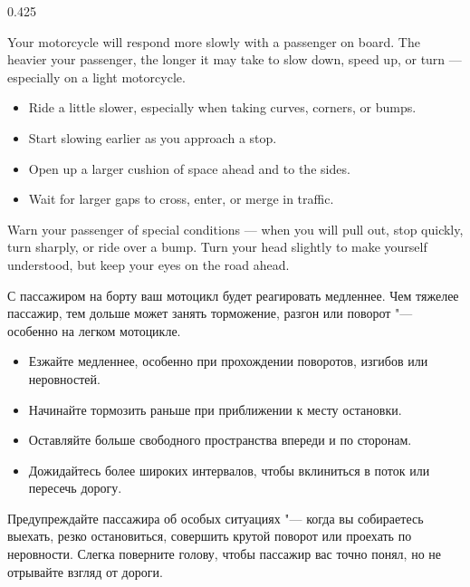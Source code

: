 \begin{langblock}{0.425}
	\begin{eng}
	
	Your motorcycle will respond more slowly with a passenger on board. The heavier your passenger, the longer it may take to slow down, speed up, or turn --- especially on a light motorcycle.
	
	\begin{itemize}[noitemsep]
		\item Ride a little slower, especially when taking curves, corners, or bumps.
		\item Start slowing earlier as you approach a stop.
		\item Open up a larger cushion of space ahead and to the sides.
		\item Wait for larger gaps to cross, enter, or merge in traffic.
	\end{itemize}
	
	
	Warn your passenger of special conditions --- when you will pull out, stop quickly, turn sharply, or ride over a bump. Turn your head slightly to make yourself understood, but keep your eyes on the road ahead.
	\end{eng}
	\begin{rus}
		
		С пассажиром на борту ваш мотоцикл будет реагировать медленнее. Чем тяжелее пассажир, тем дольше может занять торможение, разгон или поворот "--- особенно на легком мотоцикле.
		
		\begin{itemize}[noitemsep]
			\item Езжайте медленнее, особенно при прохождении поворотов, изгибов или неровностей.
			\item Начинайте тормозить раньше при приближении к месту остановки.
			\item Оставляйте больше свободного пространства впереди и по сторонам.
			\item Дожидайтесь более широких интервалов, чтобы вклиниться в поток или пересечь дорогу.
		\end{itemize}
		
		
		Предупреждайте пассажира об особых ситуациях "--- когда вы собираетесь выехать, резко остановиться, совершить крутой поворот или проехать по неровности. Слегка поверните голову, чтобы пассажир вас точно понял, но не отрывайте взгляд от дороги.
\end{rus}
\end{langblock}

